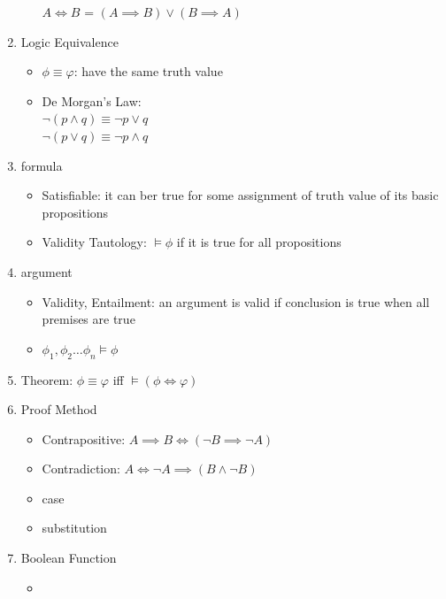 \documentclass[11pt, a4paper]{article}
\begin{document}
\begin{multicols}{3}
\begin{enumerate}
\begin{itemize}
                    $A \iff B$ = $(A \implies B) \lor (B \implies A)$
            \end{itemize}
        \item Logic Equivalence
            \begin{itemize}
                \item $\phi \equiv \varphi$: have the same truth value
                \item De Morgan's Law:\\
                    $ \lnot (p \land q) \equiv \lnot p \lor q$\\
                    $ \lnot (p \lor q) \equiv \lnot p \land q$
            \end{itemize}
        \item formula
            \begin{itemize}
                \item Satisfiable: it can ber true for some assignment of truth value of its basic propositions
                \item Validity Tautology: $\models \phi$ if it is true for all propositions
            \end{itemize}
        \item argument
            \begin{itemize}
                \item Validity, Entailment: an argument is valid if conclusion is true when all premises are true
                \item $\phi_1, \phi_2 \dots \phi_n \models \phi$
            \end{itemize}
        \item Theorem: $\phi \equiv \varphi$ iff $\models (\phi \iff \varphi)$
        \item Proof Method
            \begin{itemize}
                \item Contrapositive: $A \implies B \iff (\lnot B \implies \lnot A)$
                \item Contradiction: $A \iff \lnot A \implies (B \land \lnot B)$
                \item case
                \item substitution
            \end{itemize}
        \item Boolean Function
            \begin{itemize}
                \item             

\end{itemize}
\end{enumerate}
\end{multicols}
\end{document}
